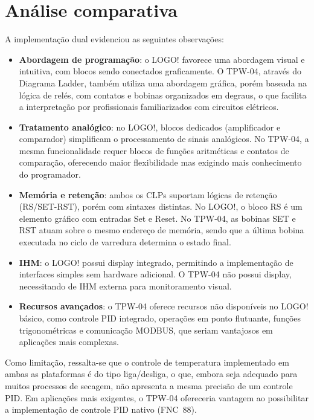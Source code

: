 \documentclass[
  12pt,
  openright,
  oneside,
  a4paper,
  chapter=TITLE,
  section=TITLE,
  brazilian
]{abntex2}
\begin{document}
\clearpage
\section{An\'{a}lise comparativa}

A implementa\c{c}\~{a}o dual evidenciou as seguintes observa\c{c}\~{o}es:

\begin{itemize}
    \item \textbf{Abordagem de programa\c{c}\~{a}o}: o LOGO! favorece uma abordagem visual e intuitiva, com blocos sendo conectados graficamente. O TPW-04, atrav\'{e}s do Diagrama Ladder, tamb\'{e}m utiliza uma abordagem gr\'{a}fica, por\'{e}m baseada na l\'{o}gica de rel\'{e}s, com contatos e bobinas organizados em degraus, o que facilita a interpreta\c{c}\~{a}o por profissionais familiarizados com circuitos el\'{e}tricos.
    \item \textbf{Tratamento anal\'{o}gico}: no LOGO!, blocos dedicados (amplificador e comparador) simplificam o processamento de sinais anal\'{o}gicos. No TPW-04, a mesma funcionalidade requer blocos de fun\c{c}\~{o}es aritm\'{e}ticas e contatos de compara\c{c}\~{a}o, oferecendo maior flexibilidade mas exigindo mais conhecimento do programador.
    \item \textbf{Mem\'{o}ria e reten\c{c}\~{a}o}: ambos os CLPs suportam l\'{o}gicas de reten\c{c}\~{a}o (RS/SET-RST), por\'{e}m com sintaxes distintas. No LOGO!, o bloco RS \'{e} um elemento gr\'{a}fico com entradas Set e Reset. No TPW-04, as bobinas SET e RST atuam sobre o mesmo endere\c{c}o de mem\'{o}ria, sendo que a \'{u}ltima bobina executada no ciclo de varredura determina o estado final.
    \item \textbf{IHM}: o LOGO! possui display integrado, permitindo a implementa\c{c}\~{a}o de interfaces simples sem hardware adicional. O TPW-04 n\~{a}o possui display, necessitando de IHM externa para monitoramento visual.
    \item \textbf{Recursos avan\c{c}ados}: o TPW-04 oferece recursos n\~{a}o dispon\'{i}veis no LOGO! b\'{a}sico, como controle PID integrado, opera\c{c}\~{o}es em ponto flutuante, fun\c{c}\~{o}es trigonom\'{e}tricas e comunica\c{c}\~{a}o MODBUS, que seriam vantajosos em aplica\c{c}\~{o}es mais complexas.
\end{itemize}

Como limita\c{c}\~{a}o, ressalta-se que o controle de temperatura implementado em ambas as plataformas \'{e} do tipo liga/desliga, o que, embora seja adequado para muitos processos de secagem, n\~{a}o apresenta a mesma precis\~{a}o de um controle PID. Em aplica\c{c}\~{o}es mais exigentes, o TPW-04 ofereceria vantagem ao possibilitar a implementa\c{c}\~{a}o de controle PID nativo (FNC~88).
\end{document}
